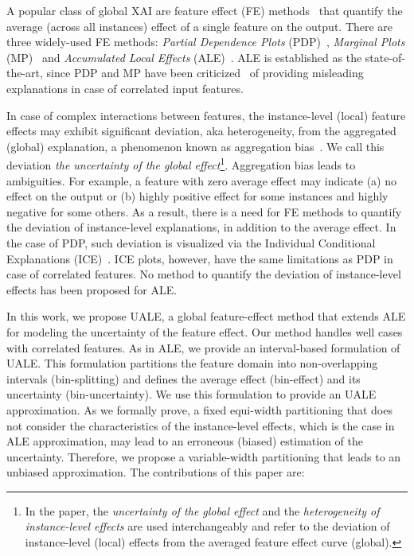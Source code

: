 \documentclass[twoside]{article}
\begin{document}
A popular class of global XAI are feature effect (FE) methods~\citep{Gromping2020MAEP} that quantify the average (across all instances) effect of a single feature on the output. There are three widely-used FE methods: \emph{Partial Dependence Plots} (PDP)~\citep{friedman2001greedy}, \emph{Marginal Plots} (MP)~\citep{apley2020visualizing} and \emph{Accumulated Local Effects} (ALE)~\citep{apley2020visualizing}. ALE is established as the state-of-the-art, since PDP and MP have been criticized~\citep{baniecki2021fooling, Gromping2020MAEP} of providing misleading explanations in case of correlated input features.

In case of complex interactions between features, the instance-level (local) feature effects may exhibit significant deviation, aka heterogeneity, from the aggregated (global) explanation, a phenomenon known as aggregation bias~\citep{mehrabi2021survey}. We call this deviation \emph{the uncertainty of the global effect}\footnote{In the paper, the \emph{uncertainty of the global effect} and the \emph{heterogeneity of instance-level effects} are used interchangeably and refer to the deviation of instance-level (local) effects from the averaged feature effect curve (global).}. Aggregation bias leads to ambiguities. For example, a feature with zero average effect may indicate (a) no effect on the output or (b) highly positive effect for some instances and highly negative for some others. As a result, there is a need for FE methods to quantify the deviation of instance-level explanations, in addition to the average effect. In the case of PDP, such deviation is visualized via the Individual Conditional Explanations (ICE)~\citep{goldstein2015peeking}. ICE plots, however, have the same limitations as PDP in case of correlated features. No method to quantify the deviation of instance-level effects has been proposed for ALE.

In this work, we propose UALE, a global feature-effect method that extends ALE for modeling the uncertainty of the feature effect. Our method handles well cases with correlated features.  As in ALE, we provide an interval-based formulation of UALE. This formulation partitions the feature domain into non-overlapping intervals (bin-splitting) and defines the average effect (bin-effect) and its uncertainty (bin-uncertainty). We use this formulation to provide an UALE approximation. As we formally prove, a fixed equi-width partitioning that does not consider the characteristics of the instance-level effects, which is the case in ALE approximation, may lead to an erroneous (biased) estimation of the uncertainty.  Therefore, we propose a variable-width partitioning that leads to an unbiased approximation. The contributions of this paper are:
\end{document}
